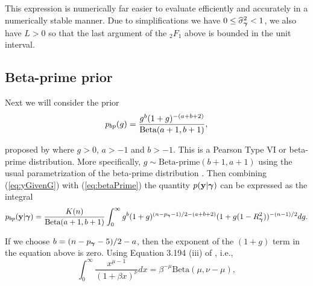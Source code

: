 
\noindent This expression is numerically far easier to evaluate efficiently and
accurately in a numerically stable manner. Due to simplifications we have $0\le
\widehat{\sigma}_{\boldsymbol \gamma}^2<1$, we also have $L>0$ so that the last argument of
the ${}_2F_1$ above is bounded in the unit interval.  


\subsection{Beta-prime prior} 

\noindent Next we will consider the prior 
\begin{equation}\label{eq:betaPrime}
	\displaystyle p_{bp}(g) = \frac{g^{b}(1 + g)^{-(a+b+2)}}{\mbox{Beta}(a+1,b+1)},
\end{equation}

\noindent proposed by \cite{Maruyama2011} where $g>0$, $a>-1$ and $b>-1$.  This
is a Pearson Type VI or beta-prime distribution. More specifically, $g\sim
\mbox{Beta-prime}(b+1,a+1)$ using the usual parametrization of the beta-prime
distribution \citep{Johnson1995}.  Then combining (\ref{eq:yGivenG}) with
(\ref{eq:betaPrime}) the quantity $p({\bf y}|{\boldsymbol \gamma})$ can be expressed as the
integral
$$
\displaystyle p_{bp}({\bf y}|{\boldsymbol \gamma}) 
=
\frac{K(n)}{\mbox{Beta}(a+1,b+1)}
\int_0^\infty             
g^{b}(1 + g)^{(n - p_{\boldsymbol \gamma} - 1)/2 - (a + b + 2)}  (1 + g (1-R_{\boldsymbol \gamma}^2) )^{-(n-1)/2}  
dg.
$$

\noindent If we choose 
$b = (n - p_{\boldsymbol \gamma} - 5)/2 - a$, then the exponent of the $(1 + g)$ term in the
equation above is zero.  Using Equation 3.194 (iii) of \cite{Gradshteyn2007},
i.e.,
$$
\int_0^\infty \frac{ x^{\mu - 1} }{(1 + \beta x)^\nu} dx = \beta^{-\mu} \mbox{Beta}(\mu,\nu - \mu),
$$

